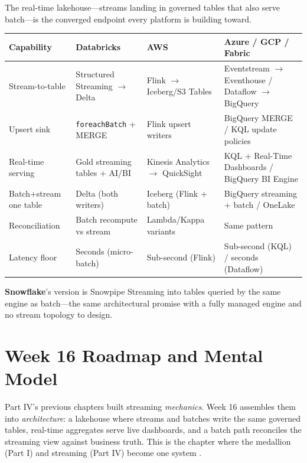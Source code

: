 \begin{crosscloud}
The real-time lakehouse---streams landing in governed tables that also serve batch---is the
converged endpoint every platform is building toward.

\vspace{2mm}
{\footnotesize
\begin{tabular}{@{}p{3.0cm}p{3.4cm}p{3.2cm}p{3.2cm}@{}}
\toprule
\textbf{Capability} & \textbf{Databricks} & \textbf{AWS} & \textbf{Azure / GCP / Fabric} \\
\midrule
Stream-to-table & Structured Streaming $\rightarrow$ Delta & Flink $\rightarrow$ Iceberg/S3 Tables & Eventstream $\rightarrow$ Eventhouse / Dataflow $\rightarrow$ BigQuery \\
Upsert sink & \texttt{foreachBatch} + MERGE & Flink upsert writers & BigQuery MERGE / KQL update policies \\
Real-time serving & Gold streaming tables + AI/BI & Kinesis Analytics $\rightarrow$ QuickSight & KQL + Real-Time Dashboards / BigQuery BI Engine \\
Batch+stream one table & Delta (both writers) & Iceberg (Flink + batch) & BigQuery streaming + batch / OneLake \\
Reconciliation & Batch recompute vs stream & Lambda/Kappa variants & Same pattern \\
Latency floor & Seconds (micro-batch) & Sub-second (Flink) & Sub-second (KQL) / seconds (Dataflow) \\
\bottomrule
\end{tabular}}

\vspace{1mm}
\textbf{Snowflake}'s version is Snowpipe Streaming into tables queried by the same engine as
batch---the same architectural promise with a fully managed engine and no stream topology to
design.
\end{crosscloud}

\section{Week 16 Roadmap and Mental Model}
Part IV's previous chapters built streaming \emph{mechanics}. Week 16 assembles them into \emph{architecture}: a lakehouse where streams and batches write the same governed tables, real-time aggregates serve live dashboards, and a batch path reconciles the streaming view against business truth. This is the chapter where the medallion (Part I) and streaming (Part IV) become one system \cite{sparkStructuredStreaming,databricksDelta}.


